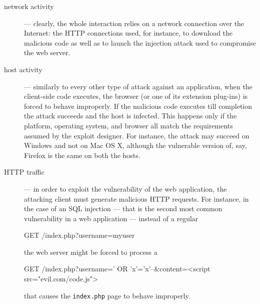 \begin{description}
\item[network activity] --- clearly, the whole interaction relies on a
  network connection over the Internet: the \ac{HTTP} connections
  used, for instance, to download the malicious code as well as to
  launch the injection attack used to compromise the web server.
\item[host activity] --- similarly to every other type of attack
  against an application, when the client-side code executes, the
  browser (or one of its extension plug-ins) is forced to behave
  improperly. If the malicious code executes till completion the
  attack succeeds and the host is infected. This happens only if the
  platform, operating system, and browser all match the requirements
  assumed by the exploit designer. For instance, the attack may
  succeed on \textsf{Windows} and not on \textsf{Mac OS X}, although
  the vulnerable version of, say, \textsf{Firefox} is the same on both
  the hosts.
\item[HTTP traffic] --- in order to exploit the vulnerability of the
  web application, the attacking client must generate malicious
  \ac{HTTP} requests. For instance, in the case of an \ac{SQL}
  injection --- that is the second most common vulnerability in a web
  application --- instead of a regular

  \begin{logs}
    GET /index.php?username=myuser
  \end{logs}
  
\noindent the web server might be forced to process a

\begin{logs}
  GET /index.php?username=' OR 'x'='x'--\&content=<script
  src="evil.com/code.js">
\end{logs}

\noindent that causes the \texttt{index.php} page to behave
improperly.
\end{description}

